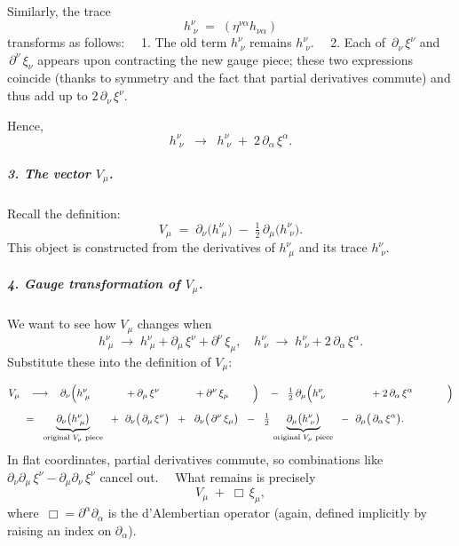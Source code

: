 \documentclass{article}
\begin{document}
\vspace{2pt}

\noindent
Similarly, the trace
\[
h^\nu_{\;\nu}
  \;=\;
(\eta^{\nu\alpha} h_{\nu\alpha})
\]
transforms as follows:  
1. The old term \(h^\nu_{\;\nu}\) remains \(h^\nu_{\;\nu}\).  
2. Each of \(\,\partial_\nu\,\xi^\nu\) and \(\,\partial^\nu\,\xi_\nu\) appears upon contracting the new gauge piece; these two expressions coincide (thanks to symmetry and the fact that partial derivatives commute) and thus add up to \(2\,\partial_\nu\,\xi^\nu\).  

Hence,
\[
h^\nu_{\;\nu}
  \;\;\longrightarrow\;\;
h^\nu_{\;\nu}
  \;+\;
2\,\partial_\alpha \,\xi^\alpha.
\]

\medskip

\noindent
\subparagraph{3. The vector \boldmath\(V_\mu\).}
Recall the definition: 
\[
V_\mu
  \;=\; 
\partial_\nu\bigl(h^\nu_{\;\mu}\bigr)
  \;-\;
\tfrac12\,\partial_\mu \bigl(h^\nu_{\;\nu}\bigr).
\]
This object is constructed from the derivatives of \(h^\nu_{\;\mu}\) and its trace \(h^\nu_{\;\nu}\).

\medskip

\noindent
\subparagraph{4. Gauge transformation of \boldmath\(V_\mu\).}
We want to see how \(V_\mu\) changes when
\[
h^\nu_{\;\mu}
  \;\to\;
h^\nu_{\;\mu} + \partial_\mu\,\xi^\nu + \partial^\nu\,\xi_\mu,
\quad
h^\nu_{\;\nu}
  \;\to\;
h^\nu_{\;\nu} + 2\,\partial_\alpha\,\xi^\alpha.
\]
Substitute these into the definition of \(V_\mu\):

\begin{equation}
\begin{aligned}
V_\mu
  &\;\;\longrightarrow\;\;
  \partial_\nu\Bigl(h^\nu_{\;\mu}
                   + \partial_\mu\,\xi^\nu
                   + \partial^\nu\,\xi_\mu
             \Bigr)
    \;-\;
  \tfrac12\,\partial_\mu\Bigl(h^\nu_{\;\nu}
                         + 2\,\partial_\alpha\,\xi^\alpha
                    \Bigr)
\\[6pt]
&=\;
  \underbrace{\partial_\nu \bigl(h^\nu_{\;\mu}\bigr)}_{\text{original }V_\mu\text{ piece}}
  \;+\;
  \partial_\nu\bigl(\,\partial_\mu\,\xi^\nu\bigr)
  \;+\;
  \partial_\nu\bigl(\,\partial^\nu\,\xi_\mu\bigr)
  \;-\;
  \tfrac12\,\underbrace{\partial_\mu\bigl(h^\nu_{\;\nu}\bigr)}_{\text{original }V_\mu\text{ piece}}
  \;-\;
  \partial_\mu\bigl(\,\partial_\alpha\,\xi^\alpha\bigr).
\end{aligned}
\end{equation}
In flat coordinates, partial derivatives commute, so combinations like 
\(\partial_\nu \partial_\mu\,\xi^\nu - \partial_\mu \partial_\nu\,\xi^\nu\) cancel out.  
What remains is precisely
\[
V_\mu
  \;+\;
\Box\,\xi_\mu,
\]
where \(\,\Box = \partial^\alpha \partial_\alpha\) is the d’Alembertian operator (again, defined implicitly by raising an index on \(\partial_\alpha\)).
\end{document}
